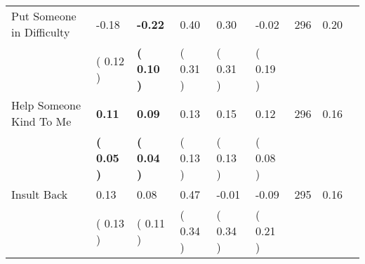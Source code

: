 \begin{tabular}{L{6.2cm} C{1.8cm} C{1.8cm} C{1.8cm} C{1.8cm} C{1.8cm} C{1.8cm} C{0.3cm} C{0.3cm}}
Put Someone in Difficulty &     -0.18 & \textbf{    -0.22} &      0.40 &      0.30 &     -0.02  & 296 &       0.20 \\ 
 & (     0.12 ) & \textbf{(     0.10 )} & (     0.31 ) & (     0.31 ) & (     0.19 )  & \\
Help Someone Kind To Me & \textbf{     0.11} & \textbf{     0.09} &      0.13 &      0.15 &      0.12  & 296 &       0.16 \\ 
 & \textbf{(     0.05 )} & \textbf{(     0.04 )} & (     0.13 ) & (     0.13 ) & (     0.08 )  & \\
Insult Back &      0.13 &      0.08 &      0.47 &     -0.01 &     -0.09  & 295 &       0.16 \\ 
 & (     0.13 ) & (     0.11 ) & (     0.34 ) & (     0.34 ) & (     0.21 )  & \\
\bottomrule
\end{tabular}
